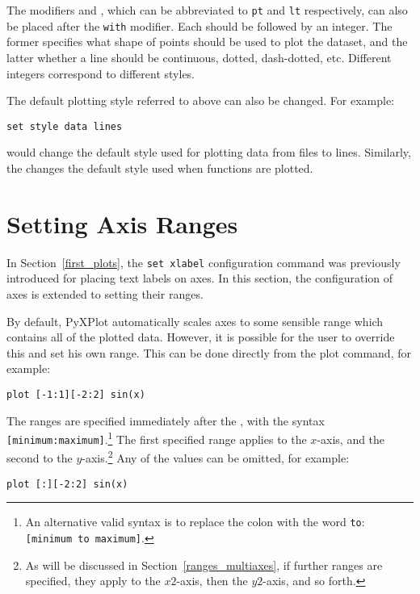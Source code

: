 The modifiers  and , which can be
abbreviated to {\tt pt} and {\tt lt} respectively, can also be placed after the
{\tt with} modifier. Each should be followed by an integer.  The former
specifies what shape of points should be used to plot the dataset, and the
latter whether a line should be continuous, dotted, dash-dotted, etc.
Different integers correspond to different styles.

The default plotting style referred to above can also be changed.  For example:

\begin{verbatim}
set style data lines
\end{verbatim}

\noindent would change the default style used for plotting data from files to
lines. Similarly, the  changes the default style
used when functions are plotted.

\section{Setting Axis Ranges}

In Section~\ref{first_plots}, the {\tt set xlabel} configuration command was
previously introduced for placing text labels on axes. In this section, the
configuration of axes is extended to setting their ranges.

By default, PyXPlot automatically scales axes to some sensible range which
contains all of the plotted data. However, it is possible for the user to
override this and set his own range. This can be
done directly from the plot command, for example:

\begin{verbatim}
plot [-1:1][-2:2] sin(x)
\end{verbatim}
\label{plot_ranges}

\noindent The ranges are specified immediately after the , with
the syntax {\tt [minimum:maximum]}.\footnote{An alternative valid syntax is to
replace the colon with the word {\tt to}: {\tt [minimum to maximum]}.} The
first specified range applies to the $x$-axis, and the second to the
$y$-axis.\footnote{As will be discussed in Section~\ref{ranges_multiaxes}, if
further ranges are specified, they apply to the $x2$-axis, then the $y2$-axis,
and so forth.} Any of the values can be omitted, for example:

\begin{verbatim}
plot [:][-2:2] sin(x)
\end{verbatim}

